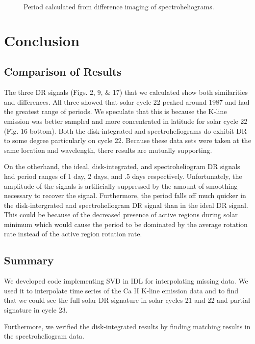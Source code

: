 \documentclass[preprint2]{aastex}
\begin{document}
\begin{figure}[H]
\caption{Period calculated from difference imaging of spectroheliograms. }
\end{figure}

\section{Conclusion}

\subsection{Comparison of Results}

The three DR signals (Figs. 2, 9, & 17) that we calculated show both similarities and differences. All three showed that solar cycle 22 peaked around 1987 and had the greatest range of periods. We speculate that this is because the K-line emission was better sampled and more concentrated in latitude for solar cycle 22 (Fig. 16 bottom). Both the disk-integrated and spectroheliograms do exhibit DR to some degree particularly on cycle 22. Because these data sets were taken at the same location and wavelength, there results are mutually supporting.

On the otherhand, the ideal, disk-integrated, and spectroheliogram DR signals had period ranges of 1 day, 2 days, and .5 days respectively. Unfortunately, the amplitude of the signals is artificially suppressed by the amount of smoothing necessary to recover the signal. Furthermore, the period falls off much quicker in the disk-intergrated and spectroheliogram DR signal than in the ideal DR signal. This could be because of the decreased presence of active regions during solar minimum which would cause the period to be dominated by the average rotation rate instead of the active region rotation rate.

\subsection{Summary}

We developed code implementing SVD in IDL for interpolating missing data. We used it to interpolate time series of the Ca II K-line emission data and to find that we could see the full solar DR signature in solar cycles 21 and 22 and partial signature in cycle 23.

Furthermore, we verified the disk-integrated results by finding matching results in the spectroheliogram data.
\end{document}
